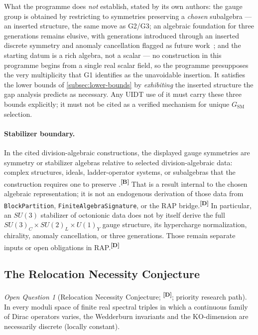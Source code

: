\documentclass[12pt,a4paper,twoside]{article}
\theoremstyle{plain}
\theoremstyle{definition}
\theoremstyle{remark}
\newtheorem{openquestion}{Open Question}
\newcommand{\catmark}[1]{\textsuperscript{\textsf{\textbf{[#1]}}}}
\begin{document}
What the programme does \emph{not} establish, stated by its own authors:
the gauge group is obtained by restricting to symmetries preserving a
\emph{chosen} subalgebra --- an inserted structure, the same move as
G2/G3; an algebraic foundation for three generations remains elusive,
with generations introduced through an inserted discrete symmetry and
anomaly cancellation flagged as future work~\cite{gourlay2024,furey2025}; and the starting datum is a
rich algebra, not a scalar --- no construction in this programme begins
from a single real scalar field, so the programme presupposes the very
multiplicity that G1 identifies as the unavoidable insertion. It
satisfies the lower bounds of \cref{subsec:lower-bounds} by
\emph{exhibiting} the inserted structure the gap analysis predicts as
necessary. Any UIDT use of it must carry these three bounds explicitly;
it must not be cited as a verified mechanism for unique
$G_{\mathrm{SM}}$ selection.

\paragraph{Stabilizer boundary.}
In the cited division-algebraic constructions, the displayed gauge
symmetries are symmetry or stabilizer algebras relative to selected
division-algebraic data: complex structures, ideals, ladder-operator
systems, or subalgebras that the construction requires one to preserve
\cite{furey2018,fureyhughes2022,furey2025}.\catmark{B}
That is a result internal to the chosen algebraic representation; it is
not an endogenous derivation of those data from
\texttt{BlockPartition}, \texttt{FiniteAlgebraSignature}, or the RAP
bridge.\catmark{D}
In particular, an $SU(3)$ stabilizer of octonionic data does not by itself
derive the full $SU(3)_C\times SU(2)_L\times U(1)_Y$ gauge structure,
its hypercharge normalization, chirality, anomaly cancellation, or three
generations. Those remain separate inputs or open obligations in RAP.\catmark{D}

\subsection{The Relocation Necessity Conjecture}
\label{subsec:rnc}

\begin{openquestion}[Relocation Necessity Conjecture; \catmark{D};
priority research path]
\label{oq:rnc}
In every moduli space of finite real spectral triples in which a
continuous family of Dirac operators varies, the Wedderburn invariants
and the KO-dimension are necessarily discrete (locally constant).
\end{openquestion}
\end{document}
